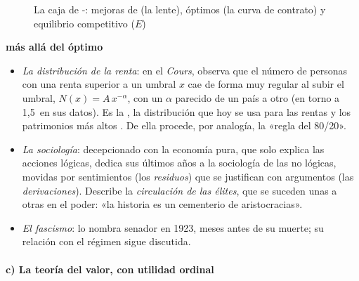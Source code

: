 \documentclass[11pt]{article}
\begin{document}
\begin{figure}[H]
\centering
\caption{La caja de -: mejoras de  (la lente), óptimos (la curva de contrato) y equilibrio competitivo ($E$)}\label{fig:pareto-caja}
\end{figure}

\begin{anotaciones}
\textbf{ más allá del óptimo}
\begin{itemize}
\item \emph{La distribución de la renta}: en el \emph{Cours},  observa que el número de personas con una renta superior a un umbral $x$ cae de forma muy regular al subir el umbral, $N(x)=A\,x^{-\alpha}$, con un $\alpha$ parecido de un país a otro (en torno a 1,5~en sus datos). Es la , la distribución que hoy se usa para las rentas y los patrimonios más altos\nocite{Pareto1896Cours}  . De ella procede, por analogía, la «regla del 80/20».
\item \emph{La sociología}: decepcionado con la economía pura, que solo explica las acciones lógicas, dedica sus últimos años a la sociología de las no lógicas, movidas por sentimientos (los \emph{residuos}) que se justifican con argumentos (las \emph{derivaciones}). Describe la \emph{circulación de las élites}, que se suceden unas a otras en el poder: «la historia es un cementerio de aristocracias»\nocite{Pareto1916Trattato}.
\item \emph{El fascismo}:  lo nombra senador en 1923, meses antes de su muerte; su relación con el régimen sigue discutida.
\end{itemize}
\end{anotaciones}

\paragraph{c) La teoría del valor, con utilidad ordinal}
\end{document}
